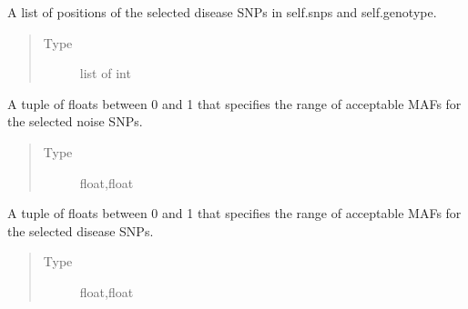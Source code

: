 \documentclass[a4paper,10pt,english]{sphinxhowto}
\begin{document}
\begin{fulllineitems}
\begin{fulllineitems}
\begin{quote}
\begin{description}
\end{description}\end{quote}

\end{fulllineitems}


\begin{fulllineitems}
\label{\detokenize{utils:utils.data_simulator.DataSimulator.disease_snps}}
A list of positions of the selected disease SNPs in self.snps and self.genotype.
\begin{quote}\begin{description}
\item[{Type}] \leavevmode
list of int

\end{description}\end{quote}

\end{fulllineitems}


\begin{fulllineitems}
\label{\detokenize{utils:utils.data_simulator.DataSimulator.noise_maf_range}}
A tuple of floats between 0 and 1 that specifies the range of acceptable MAFs for the selected noise SNPs.
\begin{quote}\begin{description}
\item[{Type}] \leavevmode
float,float

\end{description}\end{quote}

\end{fulllineitems}


\begin{fulllineitems}
\label{\detokenize{utils:utils.data_simulator.DataSimulator.disease_maf_range}}
A tuple of floats between 0 and 1 that specifies the range of acceptable MAFs for the selected disease SNPs.
\begin{quote}\begin{description}
\item[{Type}] \leavevmode
float,float


\end{description}
\end{quote}
\end{fulllineitems}
\end{fulllineitems}
\end{document}
